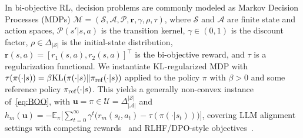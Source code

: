\documentclass{article}
\newcommand{\bu}{\mathbf{u}}
\newcommand{\U}{\mathcal{U}}
\begin{document}
In bi-objective RL, decision problems are commonly modeled as Markov Decision Processes (MDPs) $\mathcal M=(\mathcal S,\mathcal A,\mathcal P,\mathbf r,\gamma,\rho,\tau)$, where $\mathcal S$ and $\mathcal A$ are finite state and action spaces, $\mathcal P(s'|s,a)$ is the transition kernel, $\gamma\in(0,1)$ is the discount factor, $\rho\in\Delta_{|\mathcal S|}$ is the initial-state distribution, $\mathbf r(s,a)=[r_1(s,a),r_2(s,a)]^\top$ is the bi-objective reward, and $\tau$ is a regularization functional. We instantiate KL-regularized MDP with $\tau(\pi(\cdot| s)) = \beta \mathrm{KL}( \pi(\cdot| s) \| \pi_{\rm ref}(\cdot| s))$ applied to the policy $\pi$ with $\beta>0$ and some reference policy $\pi_{\rm ref}(\cdot|s)$. This yields a generally non-convex instance of~\eqref{eq:BOO}, with $\bu=\pi\in\U=\Delta_{|\mathcal A|}^{|\mathcal S|}$ and $h_m(\bu) = -\mathbb E_{\pi} \big[ \sum_{t=0}^{\infty}\gamma^t\bigl(r_m(s_t,a_t)-\tau(\pi(\cdot|s_t))\bigr) \big]$, covering LLM alignment settings with competing rewards~\citep{dai2023safe,shi2024decoding} and RLHF/DPO-style objectives~\citep{rafailov2023direct,dai2023safe,xiong2025projection}. 
\end{document}
